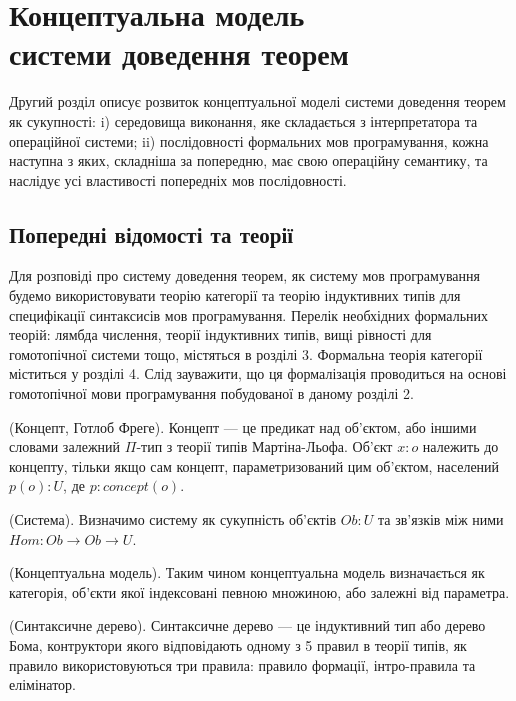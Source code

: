 
\chapter{Концептуальна модель \\ системи доведення теорем}
Другий розділ описує розвиток концептуальної моделі системи доведення теорем як сукупності:
i) середовища виконання, яке складається з інтерпретатора та операційної системи;
ii) послідовності формальних мов програмування,
кожна наступна з яких, складніша за попередню,
має свою операційну семантику, та наслідує усі властивості
попередніх мов послідовності.

\section{Попередні відомості та теорії}
Для розповіді про систему доведення теорем, як систему мов програмування
будемо використовувати теорію категорії та теорію індуктивних
типів для специфікації синтаксисів мов програмування. Перелік необхідних формальних теорій:
лямбда числення, теорії індуктивних типів, вищі рівності для гомотопічної системи
тощо, містяться в розділі 3. Формальна теорія категорії міститься у розділі 4.
Слід зауважити, що ця формалізація проводиться на основі гомотопічної
мови програмування побудованої в даному розділі 2.

\begin{definition} (Концепт, Готлоб Фреге).
Концепт --- це предикат над об'єктом,
або іншими словами залежний $\Pi$-тип з теорії типів Мартіна-Льофа.
Об'єкт $x : o$ належить до концепту, тільки якщо сам концепт,
параметризований цим об'єктом, населений $p(o) : U$, де $p : concept(o)$.
\end{definition}

\begin{definition} (Система).
Визначимо систему як сукупність об'єктів $Ob : U$
та зв'язків між ними $Hom : Ob \rightarrow Ob \rightarrow U$.
\end{definition}

\begin{definition} (Концептуальна модель).
Таким чином концептуальна модель визначається як категорія, об'єкти якої
індексовані певною множиною, або залежні від параметра.
\end{definition}

\begin{definition} (Синтаксичне дерево).
Синтаксичне дерево --- це індуктивний тип або дерево Бома,
контруктори якого відповідають одному з 5 правил в теорії типів,
як правило використовуються три правила: правило формації, інтро-правила та елімінатор.
\end{definition}

